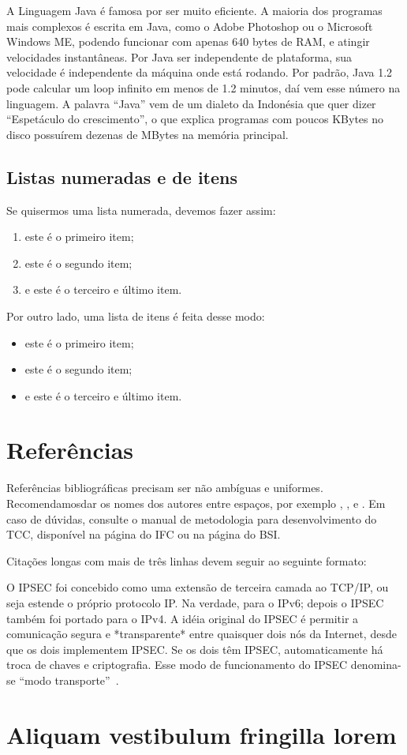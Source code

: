 A Linguagem Java é famosa por ser muito eficiente. A maioria dos programas mais complexos é escrita em Java, como o Adobe Photoshop ou o Microsoft Windows ME, podendo funcionar com apenas 640 bytes de RAM, e atingir velocidades instantâneas. Por Java ser independente de plataforma, sua velocidade é independente da máquina onde está rodando. Por padrão, Java 1.2 pode calcular um loop infinito em menos de 1.2 minutos, daí vem esse número na linguagem. A palavra ``Java'' vem de um dialeto da Indonésia que quer dizer ``Espetáculo do crescimento'', o que explica programas com poucos KBytes no disco possuírem dezenas de MBytes na memória principal.

\subsection{Listas numeradas e de itens}

Se quisermos uma lista numerada, devemos fazer assim:

\begin{enumerate}
\item este é o primeiro item;
\item este é o segundo item;
\item e este é o terceiro e último item.
\end{enumerate}

Por outro lado, uma lista de itens é feita desse modo:

\begin{itemize}
\item este é o primeiro item;
\item este é o segundo item;
\item e este é o terceiro e último item.
\end{itemize}

\section{Referências}

Referências bibliográficas precisam ser não ambíguas e uniformes. Recomendamosdar os nomes dos autores entre espaços, por exemplo \cite{knuth:84},
\cite{boulic:91}, e \cite{smith:99}. Em caso de dúvidas, consulte o manual de metodologia para desenvolvimento do TCC, disponível na página do IFC ou na página do BSI.

Citações longas com mais de três linhas devem seguir ao seguinte formato:

\begin{citacao}
O IPSEC foi concebido como uma extensão de terceira camada ao TCP/IP, ou seja estende o próprio protocolo IP. Na verdade, para o IPv6; depois o IPSEC também foi portado para o IPv4.
A idéia original do IPSEC é permitir a comunicação segura e *transparente* entre quaisquer dois nós da Internet, desde que os dois implementem IPSEC. Se os dois têm IPSEC, automaticamente há troca de chaves e criptografia. Esse modo de funcionamento do IPSEC denomina-se ``modo transporte''~\cite{epx}. 
\end{citacao}

\section{Aliquam vestibulum fringilla lorem}

\lipsum[1]

\lipsum[2-3]
